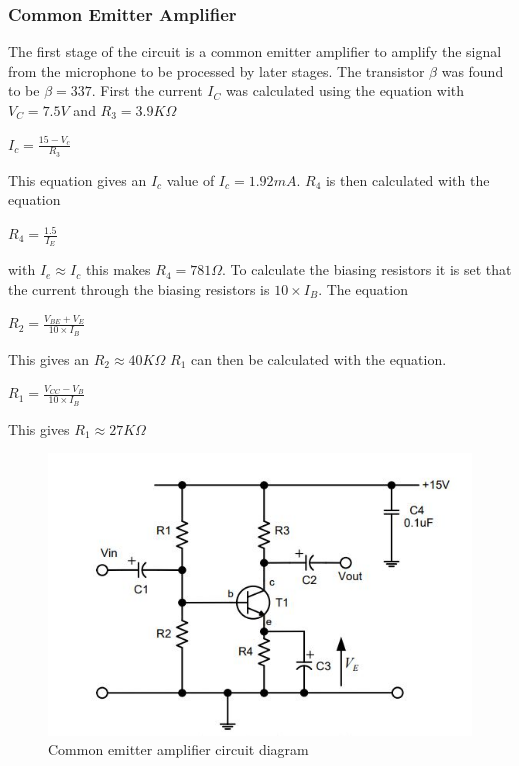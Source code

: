 \documentclass[10pt,a4paper]{article}
\begin{document}
\subsubsection{Common Emitter Amplifier}
The first stage of the circuit is a common emitter amplifier to amplify the signal from the microphone to be processed by later stages. The transistor $\beta$ was found to be $\beta = 337$. First the current $I_C$ was calculated using the equation with $V_C = 7.5V$ and $ R_3 = 3.9K\Omega$ \newline
\begin{center}
\Huge
$I_c = \frac{15-V_c}{R_3}$
\end{center}
This equation gives an $I_c$ value of $ I_c = 1.92mA$. $R_4$ is then calculated with the equation
\begin{center}
\Huge
$R_4 = \frac{1.5}{I_E}$
\end{center}
with $I_e \approx I_c$ this makes $R_4= 781 \Omega$. To calculate the biasing resistors it is set that the current through the biasing resistors is $10\times I_B$. The equation 
\begin{center}
\Huge
$R_2 = \frac{V_{BE} + V_E}{10\times I_B}$
\end{center}
This gives an $R_2 \approx 40K\Omega$
$R_1$ can then be calculated with the equation.
\begin{center}
\Huge
$R_1 = \frac{V_{CC}-V_B}{10\times I_B}$
\end{center} 
This gives $R_1 \approx 27K\Omega$
\begin{figure}
\includegraphics[scale=1]{CircuitDiagram}
\caption{Common emitter amplifier circuit diagram}
\end{figure}
\end{document}
